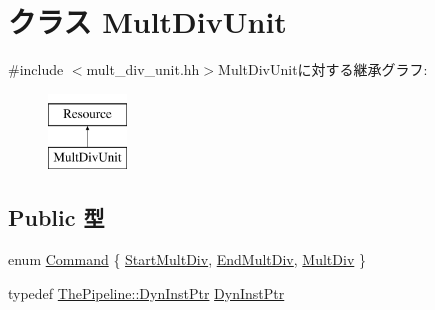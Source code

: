\hypertarget{classMultDivUnit}{
\section{クラス MultDivUnit}
\label{classMultDivUnit}
}


{\ttfamily \#include $<$mult\_\-div\_\-unit.hh$>$}MultDivUnitに対する継承グラフ:\begin{figure}[H]
\begin{center}
\leavevmode
\includegraphics[height=2cm]{classMultDivUnit}
\end{center}
\end{figure}
\subsection*{Public 型}
\begin{DoxyCompactItemize}
\item 
enum \hyperlink{classMultDivUnit_a2afce0a47a93eee73a314d53e4890153}{Command} \{ \hyperlink{classMultDivUnit_a2afce0a47a93eee73a314d53e4890153a6ded56976b09184c56bb6dc915d85cb9}{StartMultDiv}, 
\hyperlink{classMultDivUnit_a2afce0a47a93eee73a314d53e4890153ac6d3f912ad053b041f0b678ce638aa1d}{EndMultDiv}, 
\hyperlink{classMultDivUnit_a2afce0a47a93eee73a314d53e4890153ae0fa22f976c0a44ad163747dc6b6b4f2}{MultDiv}
 \}
\item 
typedef \hyperlink{classRefCountingPtr}{ThePipeline::DynInstPtr} \hyperlink{classMultDivUnit_af9d0c8a46736ba6aa2d8bb94da1a5e73}{DynInstPtr}
\end{DoxyCompactItemize}
